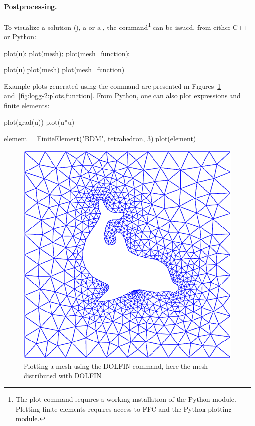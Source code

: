\paragraph{Postprocessing.}

To visualize a solution (), a  or a
, the  command\footnote{The plot command
  requires a working installation of the  Python
  module. Plotting finite elements requires access to FFC
  and the  Python plotting module.} can be issued, from either C++ or Python:
\begin{c++}
plot(u);
plot(mesh);
plot(mesh_function);
\end{c++}
\begin{python}
plot(u)
plot(mesh)
plot(mesh_function)
\end{python}
Example plots generated using the  command are presented in
Figures~\ref{fig:logg-2:plots,mesh} and~\ref{fig:logg-2:plots,function}.
From Python, one can also plot expressions and finite elements:
\begin{python}
plot(grad(u))
plot(u*u)

element = FiniteElement("BDM", tetrahedron, 3)
plot(element)
\end{python}

\begin{figure}
\bwfig
  \centering
  \includegraphics[width=\smallfig]{chapters/logg-2/png/plot_mesh.png}
  \caption{Plotting a mesh using the DOLFIN  command, here
    the mesh  distributed with DOLFIN.}
    \label{fig:logg-2:plots,mesh}
\end{figure}

